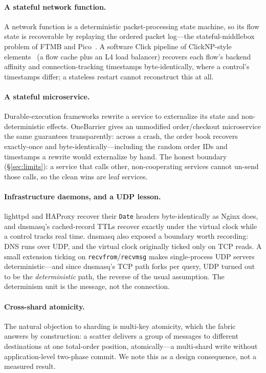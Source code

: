 \paragraph{A stateful network function.} A network function is a
deterministic packet-processing state machine, so its flow state is
recoverable by replaying the ordered packet log---the stateful-middlebox
problem of FTMB and Pico~\citep{sherry2015ftmb,rajagopalan2013pico}. A
software Click pipeline of ClickNP-style elements~\citep{li2016clicknp} (a
flow cache plus an L4 load balancer) recovers each flow's backend affinity
and connection-tracking timestamps byte-identically, where a control's
timestamps differ; a stateless restart cannot reconstruct this at all.

\paragraph{A stateful microservice.} Durable-execution frameworks rewrite
a service to externalize its state and non-deterministic effects.
OneBarrier gives an unmodified order/checkout microservice the same
guarantees transparently: across a crash, the order book recovers
exactly-once and byte-identically---including the random order IDs and
timestamps a rewrite would externalize by hand. The honest boundary
(\S\ref{sec:limits}): a service that calls other, non-cooperating services
cannot un-send those calls, so the clean wins are leaf services.

\paragraph{Infrastructure daemons, and a UDP lesson.} lighttpd and HAProxy
recover their \texttt{Date} headers byte-identically as Nginx does, and
dnsmasq's cached-record TTLs recover exactly under the virtual clock while
a control tracks real time. dnsmasq also exposed a boundary worth
recording: DNS runs over UDP, and the virtual clock originally ticked only
on TCP reads. A small extension ticking on
\texttt{recvfrom}/\texttt{recvmsg} makes single-process UDP servers
deterministic---and since dnsmasq's TCP path forks per query, UDP turned
out to be the \emph{deterministic} path, the reverse of the usual
assumption. The determinism unit is the message, not the connection.

\paragraph{Cross-shard atomicity.} The natural objection to sharding is
multi-key atomicity, which the fabric answers by construction: a scatter
delivers a group of messages to different destinations at one total-order
position, atomically---a multi-shard write without application-level
two-phase commit. We note this as a design consequence, not a measured
result.

